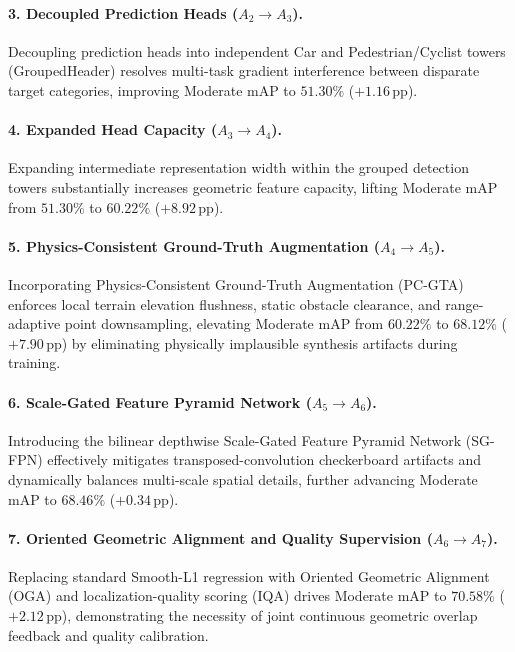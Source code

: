\paragraph{3. Decoupled Prediction Heads ($A_2 \to A_3$).}
Decoupling prediction heads into independent Car and Pedestrian/Cyclist towers (GroupedHeader) resolves multi-task gradient interference between disparate target categories, improving Moderate mAP to $51.30\%$ ($+1.16\,\text{pp}$).

\paragraph{4. Expanded Head Capacity ($A_3 \to A_4$).}
Expanding intermediate representation width within the grouped detection towers substantially increases geometric feature capacity, lifting Moderate mAP from $51.30\%$ to $60.22\%$ ($+8.92\,\text{pp}$).

\paragraph{5. Physics-Consistent Ground-Truth Augmentation ($A_4 \to A_5$).}
Incorporating Physics-Consistent Ground-Truth Augmentation (PC-GTA) enforces local terrain elevation flushness, static obstacle clearance, and range-adaptive point downsampling, elevating Moderate mAP from $60.22\%$ to $68.12\%$ ($+7.90\,\text{pp}$) by eliminating physically implausible synthesis artifacts during training.

\paragraph{6. Scale-Gated Feature Pyramid Network ($A_5 \to A_6$).}
Introducing the bilinear depthwise Scale-Gated Feature Pyramid Network (SG-FPN) effectively mitigates transposed-convolution checkerboard artifacts and dynamically balances multi-scale spatial details, further advancing Moderate mAP to $68.46\%$ ($+0.34\,\text{pp}$).

\paragraph{7. Oriented Geometric Alignment and Quality Supervision ($A_6 \to A_7$).}
Replacing standard Smooth-L1 regression with Oriented Geometric Alignment (OGA) and localization-quality scoring (IQA) drives Moderate mAP to $70.58\%$ ($+2.12\,\text{pp}$), demonstrating the necessity of joint continuous geometric overlap feedback and quality calibration.

